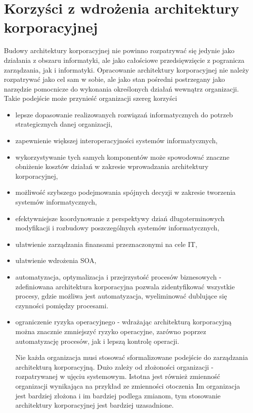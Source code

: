 \section{Korzyści z wdrożenia architektury korporacyjnej}
Budowy architektury korporacyjnej nie powinno rozpatrywać się jedynie jako działania z obszaru informatyki, ale jako całościowe przedsięwzięcie z pogranicza zarządzania, jak i informatyki. Opracowanie architektury korporacyjnej nie należy rozpatrywać jako cel sam w sobie, ale jako stan pośredni postrzegany jako narzędzie pomocnicze do wykonania określonych działań wewnątrz organizacji. Takie podejście może przynieść organizacji szereg korzyści
\begin{itemize}
\item{lepsze dopasowanie realizowanych rozwiązań informatycznych do potrzeb strategicznych danej organizacji,}
\item{zapewnienie większej interoperacyjności systemów informatycznych,}
\item{wykorzystywanie tych samych komponentów może spowodować znaczne obniżenie kosztów działań w zakresie wprowadzania architektury korporacyjnej,}
\item{możliwość szybszego podejmowania spójnych decyzji w zakresie tworzenia systemów informatycznych,}
\item{efektywniejsze koordynowanie z perspektywy dziań długoterminowych modyfikacji i rozbudowy poszczególnych systemów informatycznych,}
\item{ułatwienie zarządzania finansami przeznaczonymi na cele IT,}
\item{ułatwienie wdrożenia SOA,}
\item{automatyzacja, optymalizacja i przejrzystość procesów biznesowych - zdefiniowana architektura korporacyjna pozwala zidentyfikować wszystkie procesy, gdzie możliwa jest automatyzacja, wyeliminować dublujące się czynności pomiędzy procesami.}
\item{ograniczenie ryzyka operacyjnego - wdrażając architekturą korporacyjną można znacznie zmniejszyć ryzyko operacyjne, zarówno poprzez automatyzację procesów, jak i lepszą kontrolę operacji.}

Nie każda organizacja musi stosować sformalizowane podejście do zarządzania architekturą korporacyjną. Dużo zależy od złożoności organizacji - rozpatrywanej w ujęciu systemowym. Istotna jest również zmienność organizacji wynikająca na przykład ze zmienności otoczenia Im organizacja jest bardziej złożona i im bardziej podlega zmianom, tym stosowanie architektury korporacyjnej jest bardziej uzasadnione.\cite{ArchKorpSob}
\end{itemize}

